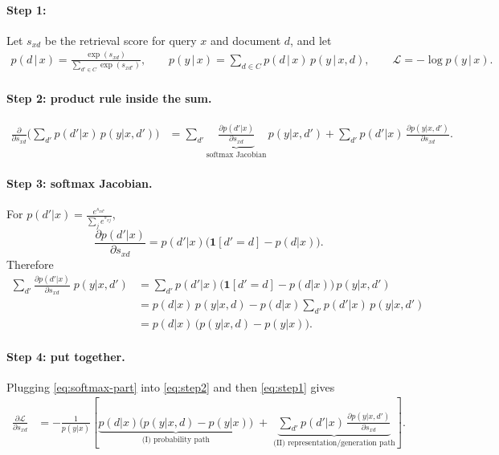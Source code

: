 \documentclass{applemlr}
\newcommand{\px}{p(y\,|\,x)}
\newcommand{\pd}{p(d\,|\,x)}
\newcommand{\qyd}{p(y\,|\,x,d)}
\newcommand{\sd}{s_{xd}}
\numberwithin{equation}{section}
\begin{document}
\paragraph{Step 1:}
Let $s_{xd}$ be the retrieval score for query $x$ and document $d$, and let
\begin{align}
\pd = \frac{\exp(\sd)}{\sum_{d'\in C}\exp(s_{xd'})}, \qquad
\px = \sum_{d\in C} \pd\,\qyd, \qquad
\mathcal{L} = -\log \px. \label{eq:step1}
\end{align}



\paragraph{Step 2: product rule inside the sum.}
\begin{align}
\frac{\partial}{\partial s_{xd}}
\Big(\sum_{d'} p(d'|x)\,p(y|x,d')\Big)
&= \sum_{d'} 
\underbrace{\frac{\partial p(d'|x)}{\partial s_{xd}}}_{\text{softmax Jacobian}}
\,p(y|x,d')
+ \sum_{d'} p(d'|x)\,\frac{\partial p(y|x,d')}{\partial s_{xd}}.
\label{eq:step2}
\end{align}

\paragraph{Step 3: softmax Jacobian.}
For $p(d'|x)=\frac{e^{s_{xd'}}}{\sum_j e^{s_{xj}}}$,
\[
\frac{\partial p(d'|x)}{\partial s_{xd}}
= p(d'|x)\big(\mathbf 1[d'=d]-p(d|x)\big).
\]
Therefore
\begin{align}
\sum_{d'} 
\frac{\partial p(d'|x)}{\partial s_{xd}}\;p(y|x,d')
&= \sum_{d'} p(d'|x)\big(\mathbf 1[d'=d]-p(d|x)\big)\,p(y|x,d') \\
&= p(d|x)\,p(y|x,d) - p(d|x)\sum_{d'} p(d'|x)\,p(y|x,d') \\
&= p(d|x)\,\big(p(y|x,d)-p(y|x)\big).
\label{eq:softmax-part}
\end{align}

\paragraph{Step 4: put together.}
Plugging \eqref{eq:softmax-part} into \eqref{eq:step2} and then \eqref{eq:step1} gives
\begin{align}
\frac{\partial \mathcal L}{\partial s_{xd}}
&= -\frac{1}{p(y|x)}\left[
\underbrace{p(d|x)\big(p(y|x,d)-p(y|x)\big)}_{\text{(I) probability path}}
\;+\;
\underbrace{\sum_{d'} p(d'|x)\,\frac{\partial p(y|x,d')}{\partial s_{xd}}}_{\text{(II) representation/generation path}}
\right].
\label{eq:unified-sum}
\end{align}
\end{document}
